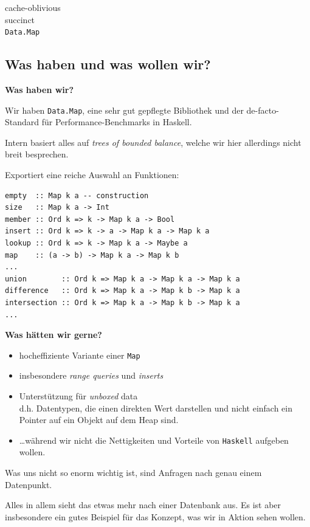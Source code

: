 \documentclass{beamer}
\begin{document}
\begin{frame}
\Large
\begin{center}
cache-oblivious\\
succinct\\
\texttt{Data.Map}
\end{center}
\normalsize
\end{frame}

\subsection{Was haben und was wollen wir?}

\begin{frame}[fragile]
\textbf{Was haben wir?}
\bigskip

Wir haben \texttt{Data.Map}, eine sehr gut gepflegte Bibliothek und der de-facto-Standard für
Performance-Benchmarks in Haskell.
\pause

Intern basiert alles auf \emph{trees of bounded balance}, welche wir hier allerdings nicht breit besprechen.\pause\bigskip

Exportiert eine reiche Auswahl an Funktionen:

\begin{verbatim}
empty  :: Map k a -- construction
size   :: Map k a -> Int
member :: Ord k => k -> Map k a -> Bool
insert :: Ord k => k -> a -> Map k a -> Map k a 
lookup :: Ord k => k -> Map k a -> Maybe a 
map    :: (a -> b) -> Map k a -> Map k b 
...
union        :: Ord k => Map k a -> Map k a -> Map k a 
difference   :: Ord k => Map k a -> Map k b -> Map k a
intersection :: Ord k => Map k a -> Map k b -> Map k a 
...
\end{verbatim}
\end{frame}


\begin{frame}
\textbf{Was hätten wir gerne?}
\pause
\bigskip
\begin{itemize}
\item hocheffiziente Variante einer \texttt{Map}\pause
\item insbesondere \emph{range queries} und \emph{inserts}\pause
\item Unterstützung für \emph{unboxed} data\\
      d.h. Datentypen, die einen direkten Wert darstellen und nicht einfach ein Pointer auf ein Objekt auf dem Heap sind.\pause
\item \dots während wir nicht die Nettigkeiten und Vorteile von \texttt{Haskell} aufgeben wollen.\pause
\end{itemize}

Was uns nicht so enorm wichtig ist, sind Anfragen nach genau einem Datenpunkt.\smallskip

Alles in allem sieht das etwas mehr nach einer Datenbank aus. Es ist aber insbesondere ein gutes Beispiel für das Konzept, was wir in Aktion sehen wollen.

\end{frame}
\end{document}
